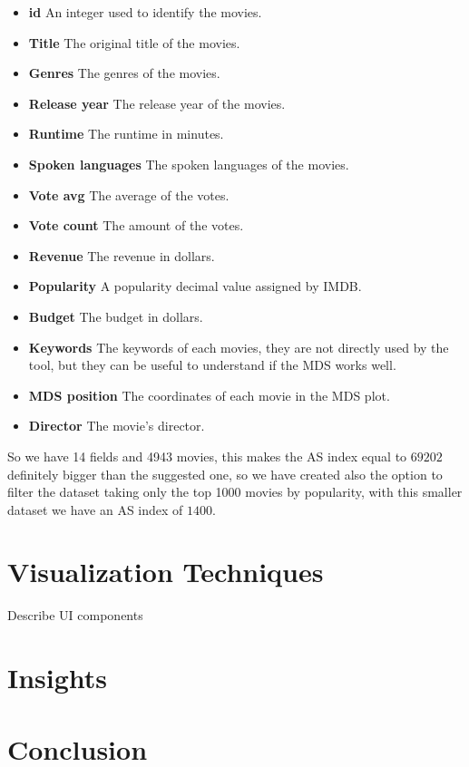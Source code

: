 \documentclass[]{article}
\begin{document}
\begin{itemize}
	\item \textbf{id} An integer used to identify the movies.
	\item \textbf{Title} The original title of the movies.
	\item \textbf{Genres} The genres of the movies.
	\item \textbf{Release year} The release year of the movies.
	\item \textbf{Runtime} The runtime in minutes.
	\item \textbf{Spoken languages} The spoken languages of the movies.
	\item \textbf{Vote avg} The average of the votes.
	\item \textbf{Vote count} The amount of the votes.
	\item \textbf{Revenue} The revenue in dollars.
	\item \textbf{Popularity} A popularity decimal value assigned by IMDB.
	\item \textbf{Budget} The budget in dollars.
	\item \textbf{Keywords}	The keywords of each movies, they are not directly used by the tool, but they can be useful to understand if the MDS works well.
	\item \textbf{MDS position} The coordinates of each movie in the MDS plot.
	\item \textbf{Director} The movie's director.
\end{itemize}
So we have 14 fields and 4943 movies, this makes the AS index equal to $69202$ definitely bigger than the suggested one, so we have created also the option to filter the dataset taking only the top 1000 movies by popularity, with this smaller dataset we have an AS index of $1400$.\newline
\section{Visualization Techniques}
Describe UI components
\section{Insights}
\section{Conclusion}
\end{document}
